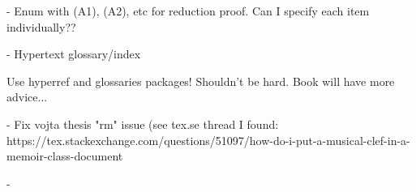 - Enum with (A1), (A2), etc for reduction proof. Can I specify each item
individually??

- Hypertext glossary/index

Use hyperref and glossaries packages! Shouldn't be hard. Book will have more
advice...

- Fix vojta thesis "rm" issue (see tex.se thread I found:
https://tex.stackexchange.com/questions/51097/how-do-i-put-a-musical-clef-in-a-memoir-class-document

- 
